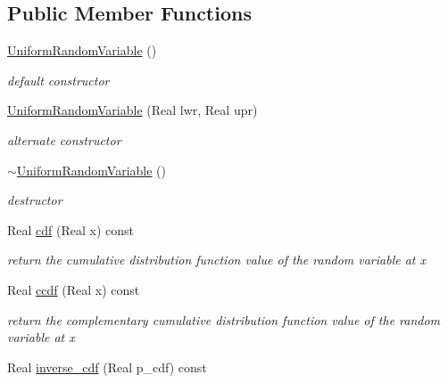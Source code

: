 \subsection*{Public Member Functions}
\begin{DoxyCompactItemize}
\item 
\hyperlink{classPecos_1_1UniformRandomVariable_a1eb9e6d1a827bf2e796d5135a6fd900c}{Uniform\+Random\+Variable} ()\label{classPecos_1_1UniformRandomVariable_a1eb9e6d1a827bf2e796d5135a6fd900c}

\begin{DoxyCompactList}\small\item\em default constructor \end{DoxyCompactList}\item 
\hyperlink{classPecos_1_1UniformRandomVariable_a40ed473a9d0c47202967956f5ef229ce}{Uniform\+Random\+Variable} (Real lwr, Real upr)\label{classPecos_1_1UniformRandomVariable_a40ed473a9d0c47202967956f5ef229ce}

\begin{DoxyCompactList}\small\item\em alternate constructor \end{DoxyCompactList}\item 
\hyperlink{classPecos_1_1UniformRandomVariable_a346724b62c537cbcb8b3cb49b1f10359}{$\sim$\+Uniform\+Random\+Variable} ()\label{classPecos_1_1UniformRandomVariable_a346724b62c537cbcb8b3cb49b1f10359}

\begin{DoxyCompactList}\small\item\em destructor \end{DoxyCompactList}\item 
Real \hyperlink{classPecos_1_1UniformRandomVariable_addd564e7f4f314e12d38df74d845f0d8}{cdf} (Real x) const \label{classPecos_1_1UniformRandomVariable_addd564e7f4f314e12d38df74d845f0d8}

\begin{DoxyCompactList}\small\item\em return the cumulative distribution function value of the random variable at x \end{DoxyCompactList}\item 
Real \hyperlink{classPecos_1_1UniformRandomVariable_a23c3b599e7e4788a9a5e9e93c3dbaf4d}{ccdf} (Real x) const \label{classPecos_1_1UniformRandomVariable_a23c3b599e7e4788a9a5e9e93c3dbaf4d}

\begin{DoxyCompactList}\small\item\em return the complementary cumulative distribution function value of the random variable at x \end{DoxyCompactList}\item 
Real \hyperlink{classPecos_1_1UniformRandomVariable_a918a1aac05ca349ea5313eebcba46c3e}{inverse\+\_\+cdf} (Real p\+\_\+cdf) const \label{classPecos_1_1UniformRandomVariable_a918a1aac05ca349ea5313eebcba46c3e}


\end{DoxyCompactItemize}
